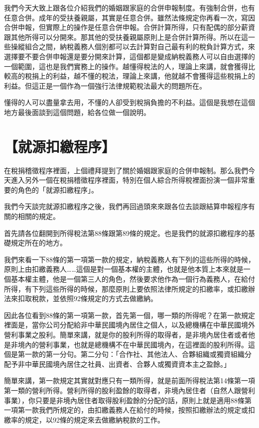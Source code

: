 \documentclass[oneside,sub3section]{ctexbook}
\begin{document}
我們今天大致上跟各位介紹我們的婚姻跟家庭的合併申報制度。有強制合併，也有任意合併。成年的受扶養親屬，其實是任意合併。雖然法條規定你再看一次，寫因合併申報，但實際上的操作是任意合併申報。合併計算所得，只有配偶的部分薪資跟其他所得可以分開來。那其他的受扶養親屬原則上是合併計算所得。所以在這一些操縱組合之間，納稅義務人個別都可以去計算對自己最有利的稅負計算方式，來選擇要不要合併申報還是要分開來計算，這個都是變成納稅義務人可以自由選擇的一個範圍，這也是我們實務上的操作。越懂得稅法的人，理論上來講，就會獲得比較高的稅捐上的利益，越不懂的稅法，理論上來講，他就越不會獲得這些稅捐上的利益。但這正是一個作為一個強行法律規範稅法最大的問題所在。

懂得的人可以盡量拿去用，不懂的人卻受到稅捐負擔的不利益。這個是我想在這個地方最後面談到這個問題，給各位做一個說明。

\hypertarget{ux5c31ux6e90ux6263ux7e73ux7a0bux5e8f}{%
\section{【就源扣繳程序】}\label{ux5c31ux6e90ux6263ux7e73ux7a0bux5e8f}}

在稅捐稽徵程序裡面，上個禮拜提到了關於婚姻跟家庭的合併申報制。那么我們今天進入另外一個在稅捐稽徵程序裡面，特別在個人綜合所得稅裡面扮演一個非常重要的角色的「就源扣繳程序」。

我們今天談完就源扣繳程序之後，我們再回過頭來來跟各位去談跟結算申報程序有關的相關的規定。

首先請各位翻開到所得稅法第88條跟第89條的規定。也是我們的就源扣繳程序的基礎規定所在的地方。

我們來看一下88條的第一項第一款的規定，納稅義務人有下列的這些所得的時候，原則上由扣繳義務人\ldots\ldots 這個是對一個基本權的主體，也就是他本質上本來就是一個基本權主體，他是一個第三人的角色，然後要求他作為一個行為義務人，在給付所得，有下列這些所得的時候，那麼原則上要依照法律所規定的扣繳率，或扣繳辦法來扣取稅款，並依照92條規定的方式去做繳納。

因此各位看到88條的第一項第一款，首先第一個，哪一類的所得呢？在第一款規定裡面是，當你公司分配給非中華民國境內居住之個人，以及總機構在中華民國境外營利事業之股利。簡單來講，就是你的股利所得的取得者，是非境內居住者或者他是非境內的營利事業，也就是總機構不在中華民國境內，在這裡面的股利所得。這個是第一款的第一分句。第二分句：「合作社、其他法人、合夥組織或獨資組織分配予非中華民國境內居住之社員、出資者、合夥人或獨資資本主之盈餘。」

簡單來講，第一款規定其實就對應只有一類所得，就是前面所得稅法第14條第一項第一類的營利所得。營利所得的股利盈餘的取得者，非境內居住者（自然人跟營利事業），你只要是非境內居住者取得股利盈餘的分配的話，原則上就是適用88條第一項第一款我們所規定的，由扣繳義務人在給付的時候，按照扣繳辦法的規定或扣繳率的規定，以92條的規定來去做繳納稅款的工作。
\end{document}
